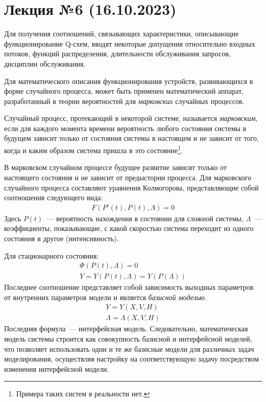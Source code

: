 \section{Лекция №6 (16.10.2023)}

Для получения соотношений, связывающих характеристики, описывающие функционирование Q-схем, вводят некоторые допущения относительно входных потоков, функций распределения, длительности обслуживания запросов, дисциплин обслуживания.

Для математического описания функционирования устройств, развивающихся в форме случайного процесса, может быть применен математический аппарат, разработанный в теории вероятностей для \textit{марковских} случайных процессов.

\begin{dd}
    Случайный процесс, протекающий в некоторой системе, называется \textit{марковским}, если для каждого момента времени вероятность любого состояния системы в будущем зависит только от состояния системы в настоящем и не зависит от того, когда и каким образом система пришла в это состояние\footnote{Примера таких систем в реальности нет.}.
\end{dd}

В марковском случайном процессе будущее развитие зависит только от настоящего состояния и не зависит от предыстории процесса. Для марковского случайного процесса составляют уравнения Колмогорова, представляющие собой соотношения следующего вида:
%
\begin{gather*}
    F(P'(t), P(t), \Lambda) = 0
\end{gather*}
%
Здесь $P(t)$~--- вероятность нахождения в состоянии для сложной системы, $\Lambda$~--- коэффициенты, показывающие, с какой скоростью система переходит из одного состояния в другое (интенсивность).

Для стационарного состояния:
%
\begin{gather*}
    \Phi(P(t), \Lambda) = 0\\
    Y = Y(P(t), \Lambda) = Y(P(\Lambda))
\end{gather*}
%
Последнее соотношение представляет собой зависимость выходных параметров от внутренних параметров модели и является \textit{базисной моделью}.
%
\begin{gather*}
    Y = Y(X, V, H)\\
    \Lambda= \Lambda(X, V, H)
\end{gather*}
%
Последняя формула~--- интерфейсная модель. Следовательно, математическая модель системы строится как совокупность базисной и интерфейсной моделей, что позволяет использовать одни и те же базисные модели для различных задач моделирования, осуществляя настройку на соответствующую задачу посредством изменения интерфейсной модели.

